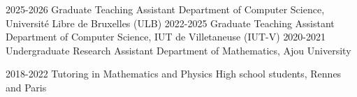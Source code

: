 

\begin{cvskills}
\cvskill
{2025-2026} %
{Graduate Teaching Assistant} %
{Department of Computer Science, Université Libre de Bruxelles (ULB)} %
\cvskill
	{2022-2025} %
	{Graduate Teaching Assistant} %
	{Department of Computer Science, IUT de Villetaneuse (IUT-V)} %
  \cvskill
    {2020-2021} %
    {Undergraduate Research Assistant} %
    {Department of Mathematics, Ajou University} %


\cvskill
{2018-2022} %
{Tutoring in Mathematics and Physics} %
{High school students, Rennes and Paris} %


\end{cvskills}
